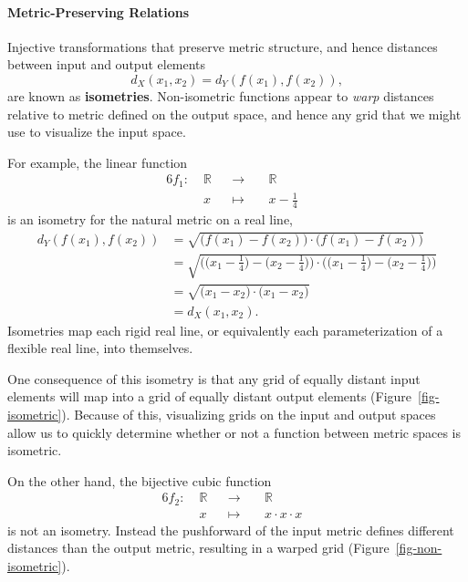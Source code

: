 \documentclass[
  letterpaper,
  DIV=11,
  numbers=noendperiod]{scrartcl}
\let\oldparagraph\paragraph
\renewcommand{\paragraph}[1]{\oldparagraph{#1}\mbox{}}
\begin{document}
\paragraph{Metric-Preserving
Relations}\label{metric-preserving-relations}

Injective transformations that preserve metric structure, and hence
distances between input and output elements \[
d_X(x_1, x_2) = d_Y(f(x_1), f(x_2)),
\] are known as \textbf{isometries}. Non-isometric functions appear to
\emph{warp} distances relative to metric defined on the output space,
and hence any grid that we might use to visualize the input space.

For example, the linear function \begin{alignat*}{6}
f_1 :\; & \mathbb{R} & &\rightarrow& \; & \mathbb{R} &
\\
& x & &\mapsto& & x - \frac{1}{4} &
\end{alignat*} is an isometry for the natural metric on a real line,
\begin{align*}
d_{Y}(f(x_1), f(x_2))
&=
\sqrt{
        \big( f(x_{1}) - f(x_{2}) \big)
  \cdot \big( f(x_{1}) - f(x_{2}) \big)
}
\\
&=
\sqrt{
        \big(
            \big( x_{1} - \frac{1}{4} \big)
          - \big( x_{2} - \frac{1}{4} \big)
        \big)
  \cdot \big(
            \big( x_{1} - \frac{1}{4} \big)
          - \big( x_{2} - \frac{1}{4} \big)
        \big)
}
\\
&=
\sqrt{
  \big( x_{1} - x_{2} \big) \cdot \big( x_{1} - x_{2} \big)
}
\\
&=
d_{X}(x_1, x_2).
\end{align*} Isometries map each rigid real line, or equivalently each
parameterization of a flexible real line, into themselves.

One consequence of this isometry is that any grid of equally distant
input elements will map into a grid of equally distant output elements
(Figure~\ref{fig-isometric}). Because of this, visualizing grids on the
input and output spaces allow us to quickly determine whether or not a
function between metric spaces is isometric.

On the other hand, the bijective cubic function \begin{alignat*}{6}
f_2 :\; & \mathbb{R} & &\rightarrow& \; & \mathbb{R} &
\\
& x & &\mapsto& & x \cdot x \cdot x &
\end{alignat*} is not an isometry. Instead the pushforward of the input
metric defines different distances than the output metric, resulting in
a warped grid (Figure~\ref{fig-non-isometric}).
\end{document}

